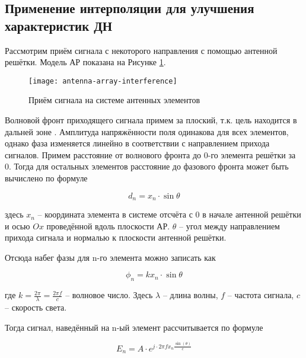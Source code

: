 \subsection{Применение интерполяции для улучшения характеристик ДН}\label{sect:interpolation-theory}

Рассмотрим приём сигнала с некоторого направления с помощью антенной решётки. 
Модель АР показана на Рисунке \ref{fig:antenna-array-interference}.

\begin{figure}[!ht]
    \centering
    \texttt{[image: antenna-array-interference]}
    \caption{Приём сигнала на системе антенных элементов}%
    \label{fig:antenna-array-interference}
\end{figure}

Волновой фронт приходящего сигнала примем за плоский, т.к. цель находится в дальней зоне \cite{Chist2012}. 
Амплитуда напряжённости поля одинакова для всех элементов, однако фаза изменяется линейно в 
соответствии с направлением прихода сигналов. 
Примем расстояние от волнового фронта до 0-го элемента решётки за 0. 
Тогда для остальных элементов расстояние до фазового фронта может быть вычислено по формуле

\begin{equation*}
    d_n=x_n \cdot \sin\theta
\end{equation*}

\noindent здесь $x_n$ -- координата элемента в системе отсчёта с $0$ в начале антенной решётки и осью $Ox$ проведённой вдоль 
плоскости АР. $\theta$ -- угол между направлением прихода сигнала и нормалью к плоскости антенной решётки. 

Отсюда набег фазы для n-го элемента можно записать как 

\begin{equation*}
    \phi_n = k x_n \cdot \sin\theta
\end{equation*}

где $k=\frac{2\pi}{\lambda}=\frac{2\pi f}{c}$ -- волновое число. Здесь $\lambda$ -- длина волны, $f$ -- частота сигнала, $c$ -- скорость света.

Тогда сигнал, наведённый на n-ый элемент рассчитывается по формуле

\begin{equation}\label{eqn:antenna-array-element-value}
    E_n=A\cdot e^{j\cdot 2 \pi f x_n \frac{\sin{(\theta)}}{c}}
\end{equation}

